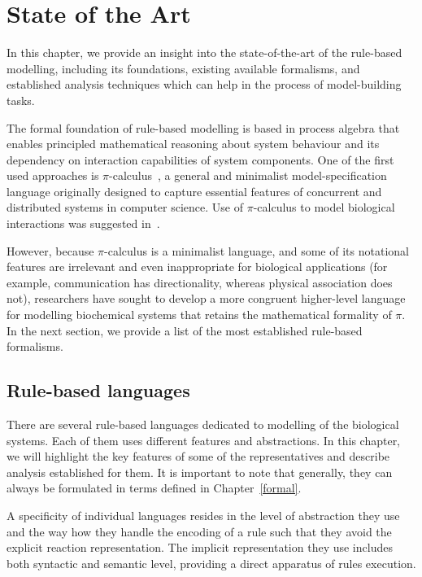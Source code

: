 \documentclass[11pt,a4paper]{report}
\begin{document}
\chapter{State of the Art} \label{chap:state}

In this chapter, we provide an insight into the state-of-the-art of the rule-based modelling, including its foundations, existing available formalisms, and established analysis techniques which can help in the process of model-building tasks.

The formal foundation of rule-based modelling is based in process algebra that enables principled mathematical reasoning about system behaviour and its dependency on interaction capabilities of system components. One of the first used approaches is $\pi$-calculus~\cite{milner1999communicating}, a general and minimalist model-specification language originally designed to capture essential features of concurrent and distributed systems in computer science. Use of $\pi$-calculus to model biological interactions was suggested in~\cite{regev2000representation}.

However, because $\pi$-calculus is a minimalist language, and some of its notational features are irrelevant and even inappropriate for biological applications (for example, communication has directionality, whereas physical association does not), researchers have sought to develop a more congruent higher-level language for
modelling biochemical systems that retains the mathematical formality of $\pi$. In the next section, we provide a list of the most established rule-based formalisms.

\section{Rule-based languages}
\label{rule_based_languages}

There are several rule-based languages dedicated to modelling of the biological systems. Each of them uses different features and abstractions. In this chapter, we will highlight the key features of some of the representatives and describe analysis established for them. It is important to note that generally, they can always be formulated in terms defined in Chapter~\ref{formal}.

A specificity of individual languages resides in the level of abstraction they use and the way how they handle the encoding of a rule such that they avoid the explicit reaction representation. The implicit representation they use includes both syntactic and semantic level, providing a direct apparatus of rules execution.
\end{document}
